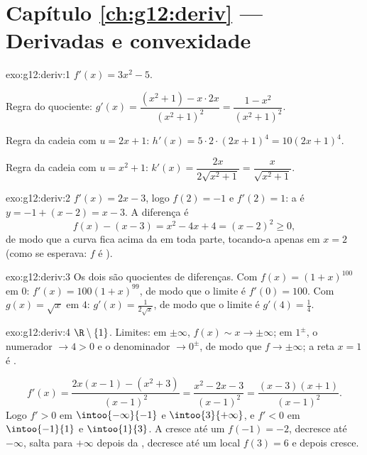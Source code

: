 \section*{Capítulo \ref{ch:g12:deriv} --- Derivadas e convexidade}

\begin{solution}{exo:g12:deriv:1}
$f'(x) = 3x^2 - 5$.

Regra do quociente:
$g'(x) = \dfrac{(x^2+1) - x\cdot 2x}{(x^2+1)^2} = \dfrac{1 - x^2}{(x^2+1)^2}$.

Regra da cadeia com $u = 2x+1$:
$h'(x) = 5 \cdot 2 \cdot (2x+1)^4 = 10(2x+1)^4$.

Regra da cadeia com $u = x^2 + 1$:
$k'(x) = \dfrac{2x}{2\sqrt{x^2+1}} = \dfrac{x}{\sqrt{x^2+1}}$.
\end{solution}

\begin{solution}{exo:g12:deriv:2}
$f'(x) = 2x - 3$, logo $f(2) = -1$ e $f'(2) = 1$: a  é
$y = -1 + (x - 2) = x - 3$. A diferença é
\[
f(x) - (x - 3) = x^2 - 4x + 4 = (x-2)^2 \geq 0 ,
\]
de modo que a curva fica acima da  em toda parte, tocando-a apenas
em $x = 2$ (como se esperava: $f$ é ).
\end{solution}

\begin{solution}{exo:g12:deriv:3}
Os dois são quocientes de diferenças. Com $f(x) = (1+x)^{100}$ em $0$:
$f'(x) = 100(1+x)^{99}$, de modo que o limite é $f'(0) = 100$. Com
$g(x) = \sqrt{x}$ em $4$: $g'(x) = \frac{1}{2\sqrt{x}}$, de modo que o
limite é $g'(4) = \frac14$.
\end{solution}

\begin{solution}{exo:g12:deriv:4}
 $\R \setminus \{1\}$. Limites: em $\pm\infty$,
$f(x) \sim x \to \pm\infty$; em $1^\pm$, o numerador $\to 4 > 0$ e o
denominador $\to 0^\pm$, de modo que $f \to \pm\infty$; a reta $x = 1$ é
.

\[
f'(x) = \frac{2x(x-1) - (x^2+3)}{(x-1)^2} = \frac{x^2 - 2x - 3}{(x-1)^2}
= \frac{(x-3)(x+1)}{(x-1)^2}.
\]
Logo $f' > 0$ em $\intoo{-\infty}{-1}$ e $\intoo{3}{+\infty}$, e
$f' < 0$ em $\intoo{-1}{1}$ e $\intoo{1}{3}$. A  cresce até um
 $f(-1) = -2$, decresce até $-\infty$, salta para $+\infty$
depois da , decresce até um  local $f(3) = 6$ e depois
cresce.
\end{solution}

